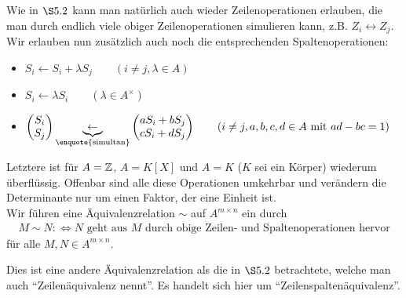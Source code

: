 \documentclass[../../main.tex]{subfiles}
\begin{document}
Wie in $\S5.2$ kann man natürlich auch wieder Zeilenoperationen erlauben, die man durch endlich viele obiger Zeilenoperationen simulieren kann, z.B. $Z_i\longleftrightarrow Z_j$. Wir erlauben nun zusätzlich auch noch die entsprechenden Spaltenoperationen:
\begin{itemize}
    \item
        $S_i\leftarrow S_i+\lambda S_j \qquad (i\neq j, \lambda\in A)$
    \item
        $S_i\leftarrow \lambda S_i\qquad(\lambda\in A^\times)$
    \item
        $\begin{pmatrix*}
            S_i\\ S_j
        \end{pmatrix*}
        \underbrace{\leftarrow}_\text{\enquote{simultan}} 
        \begin{pmatrix*}
            aS_i+bS_j\\ cS_i+dS_j
        \end{pmatrix*}
        \qquad (i\neq j, a,b,c,d\in A\text{ mit }ad-bc=1)$
\end{itemize}
Letztere ist für $A=\mathbb Z$, $A=K[X]$ und $A=K$ ($K$ sei ein Körper) wiederum überflüssig. Offenbar sind alle diese Operationen umkehrbar und verändern die Determinante nur um einen Faktor, der eine Einheit ist.\\
Wir führen eine Äquivalenzrelation $\sim$ auf $A^{m\times n}$ ein durch
\begin{align*}
    M\sim N:\Longleftrightarrow N \text{ geht aus }M\text{ durch obige Zeilen- und Spaltenoperationen hervor}
\end{align*}
für alle $M,N\in A^{m\times n}$.

\begin{warning}\label{17.1.1}
Dies ist eine andere Äquivalenzrelation als die in $\S5.2$ betrachtete, welche man auch \enquote{Zeilenäquivalenz nennt}. Es handelt sich hier um \enquote{Zeilenspaltenäquivalenz}.
\end{warning}
\end{document}
